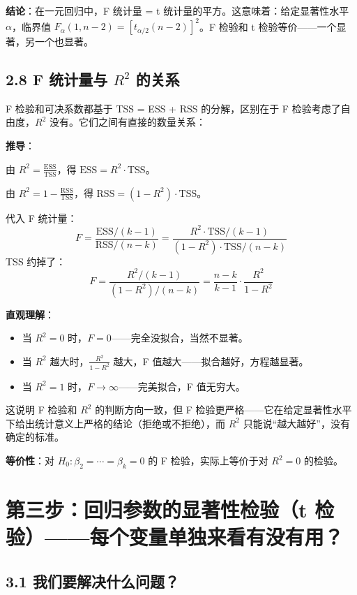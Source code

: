 \documentclass[12pt,a4paper]{ctexart}
\begin{document}
\textbf{结论}：在一元回归中，F 统计量 = t 统计量的平方。这意味着：给定显著性水平 \(\alpha\)，临界值 \(F_\alpha(1, n-2) = [t_{\alpha/2}(n-2)]^2\)。F 检验和 t 检验等价——一个显著，另一个也显著。

\subsection{2.8 F 统计量与 \(R^2\) 的关系}

F 检验和可决系数都基于 TSS = ESS + RSS 的分解，区别在于 F 检验考虑了自由度，\(R^2\) 没有。它们之间有直接的数量关系：

\textbf{推导}：

由 \(R^2 = \frac{\text{ESS}}{\text{TSS}}\)，得 \(\text{ESS} = R^2 \cdot \text{TSS}\)。

由 \(R^2 = 1 - \frac{\text{RSS}}{\text{TSS}}\)，得 \(\text{RSS} = (1 - R^2) \cdot \text{TSS}\)。

代入 F 统计量：
\[
F = \frac{\text{ESS}/(k-1)}{\text{RSS}/(n-k)} = \frac{R^2 \cdot \text{TSS} / (k-1)}{(1-R^2) \cdot \text{TSS} / (n-k)}
\]
TSS 约掉了：
\begin{equation}
F = \frac{R^2/(k-1)}{(1-R^2)/(n-k)} = \frac{n-k}{k-1} \cdot \frac{R^2}{1-R^2} \tag{3.48}
\end{equation}

\textbf{直观理解}：
\begin{itemize}
    \item 当 \(R^2 = 0\) 时，\(F = 0\)——完全没拟合，当然不显著。
    \item 当 \(R^2\) 越大时，\(\frac{R^2}{1-R^2}\) 越大，F 值越大——拟合越好，方程越显著。
    \item 当 \(R^2 = 1\) 时，\(F \to \infty\)——完美拟合，F 值无穷大。
\end{itemize}
这说明 F 检验和 \(R^2\) 的判断方向一致，但 F 检验更严格——它在给定显著性水平下给出统计意义上严格的结论（拒绝或不拒绝），而 \(R^2\) 只能说“越大越好”，没有确定的标准。

\textbf{等价性}：对 \(H_0: \beta_2 = \cdots = \beta_k = 0\) 的 F 检验，实际上等价于对 \(R^2 = 0\) 的检验。

\section{第三步：回归参数的显著性检验（t 检验）——每个变量单独来看有没有用？}

\subsection{3.1 我们要解决什么问题？}
\end{document}
